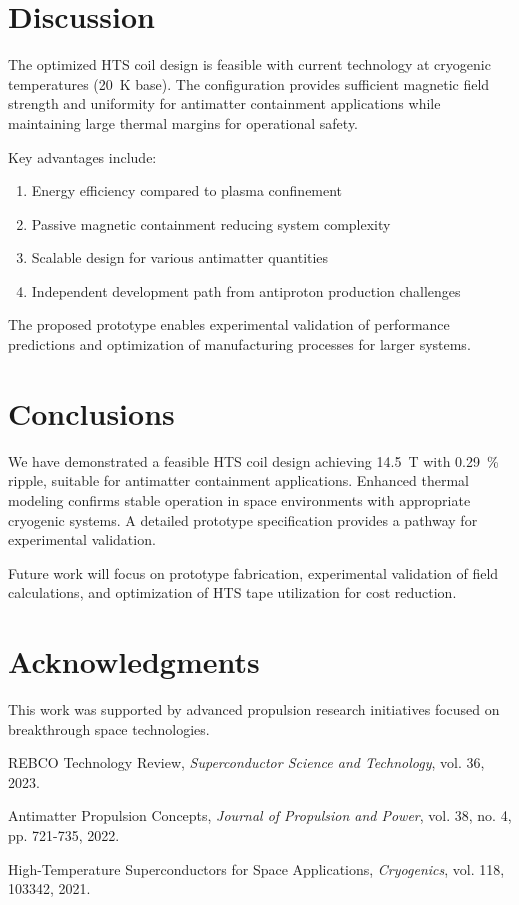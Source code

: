 \documentclass[12pt,a4paper]{article}
\begin{document}
\section{Discussion}

The optimized HTS coil design is feasible with current technology at cryogenic temperatures (\SI{20}{\kelvin} base). The configuration provides sufficient magnetic field strength and uniformity for antimatter containment applications while maintaining large thermal margins for operational safety.

Key advantages include:
\begin{enumerate}
\item Energy efficiency compared to plasma confinement
\item Passive magnetic containment reducing system complexity
\item Scalable design for various antimatter quantities
\item Independent development path from antiproton production challenges
\end{enumerate}

The proposed prototype enables experimental validation of performance predictions and optimization of manufacturing processes for larger systems.

\section{Conclusions}

We have demonstrated a feasible HTS coil design achieving \SI{14.5}{\tesla} with \SI{0.29}{\percent} ripple, suitable for antimatter containment applications. Enhanced thermal modeling confirms stable operation in space environments with appropriate cryogenic systems. A detailed prototype specification provides a pathway for experimental validation.

Future work will focus on prototype fabrication, experimental validation of field calculations, and optimization of HTS tape utilization for cost reduction.

\section{Acknowledgments}

This work was supported by advanced propulsion research initiatives focused on breakthrough space technologies.


\begin{thebibliography}{9}

REBCO Technology Review,
\emph{Superconductor Science and Technology}, vol. 36, 2023.

Antimatter Propulsion Concepts,
\emph{Journal of Propulsion and Power}, vol. 38, no. 4, pp. 721-735, 2022.

High-Temperature Superconductors for Space Applications,
\emph{Cryogenics}, vol. 118, 103342, 2021.

\end{thebibliography}
\end{document}
